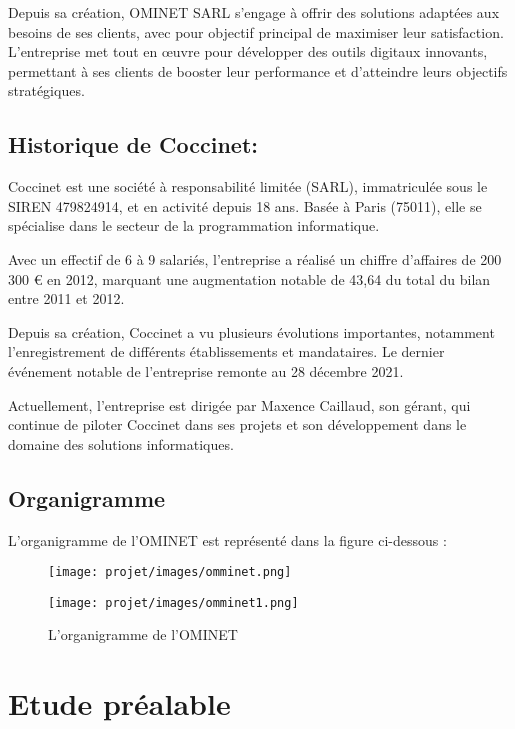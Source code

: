 Depuis sa création, OMINET SARL s'engage à offrir des solutions adaptées aux besoins de ses clients, avec pour objectif principal de maximiser leur satisfaction. L’entreprise met tout en œuvre pour développer des outils digitaux innovants, permettant à ses clients de booster leur performance et d’atteindre leurs objectifs stratégiques.


\subsection{Historique de Coccinet:}
Coccinet est une société à responsabilité limitée (SARL), immatriculée sous le SIREN 479824914, et en activité depuis 18 ans. Basée à Paris (75011), elle se spécialise dans le secteur de la programmation informatique.

Avec un effectif de 6 à 9 salariés, l’entreprise a réalisé un chiffre d'affaires de 200 300 € en 2012, marquant une augmentation notable de 43,64 du total du bilan entre 2011 et 2012.

Depuis sa création, Coccinet a vu plusieurs évolutions importantes, notamment l’enregistrement de différents établissements et mandataires. Le dernier événement notable de l’entreprise remonte au 28 décembre 2021.

Actuellement, l’entreprise est dirigée par Maxence Caillaud, son gérant, qui continue de piloter Coccinet dans ses projets et son développement dans le domaine des solutions informatiques.

\subsection{Organigramme}
L'organigramme de l'OMINET est représenté dans la figure ci-dessous :

\begin{figure}[H]
  \centering
  \begin{minipage}{0.45\textwidth}
    \centering
    \texttt{[image: projet/images/omminet.png]}
  \end{minipage}
  \hfill
  \begin{minipage}{0.45\textwidth}
    \centering
    \texttt{[image: projet/images/omminet1.png]}
  \end{minipage}
  \caption{L’organigramme de l’OMINET}
\end{figure}
\section{Etude préalable }
